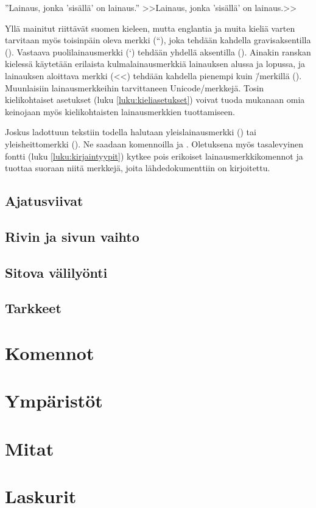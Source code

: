 \begin{koodilohkosis}
  ''Lainaus, jonka 'sisällä' on lainaus.''
  >>Lainaus, jonka 'sisällä' on lainaus.>>
\end{koodilohkosis}

Yllä mainitut riittävät suomen kieleen, mutta englantia ja muita kieliä
varten tarvitaan myös toisinpäin oleva merkki (``), joka tehdään
kahdella gra\-vis\-ak\-sen\-til\-la (). Vastaava
puolilainausmerkki (`) tehdään yhdellä aksentilla (). Ainakin
ranskan kielessä käytetään erilaista kulmalainausmerkkiä lainauksen
alussa ja lopussa, ja lainauksen aloittava merkki (<<) tehdään kahdella
pienempi kuin \=/merkillä (\koodi{<<}). Muunlaisiin lainausmerkkeihin
tarvittaneen Unicode\-/merkkejä. Tosin kielikohtaiset asetukset (luku
\ref{luku:kieliasetukset}) voivat tuoda mukanaan omia keinojaan myös
kielikohtaisten lainausmerkkien tuottamiseen.

Joskus ladottuun tekstiin todella halutaan yleislainausmerkki
(\textquotedbl) tai yleisheittomerkki (\textquotesingle). Ne saadaan
komennoilla  ja .
Oletuksena myös tasalevyinen fontti (luku \ref{luku:kirjaintyypit})
kytkee pois erikoiset lainausmerkkikomennot ja tuottaa suoraan niitä
merkkejä, joita lähdedokumenttiin on kirjoitettu.

\subsection{Ajatusviivat}
\subsection{Rivin ja sivun vaihto}
\subsection{Sitova välilyönti}
\subsection{Tarkkeet}
\label{luku:tarkkeet}
\section{Komennot}
\label{luku:komennot}
\section{Ympäristöt}
\label{luku:ymparistot}
\section{Mitat}
\section{Laskurit}
